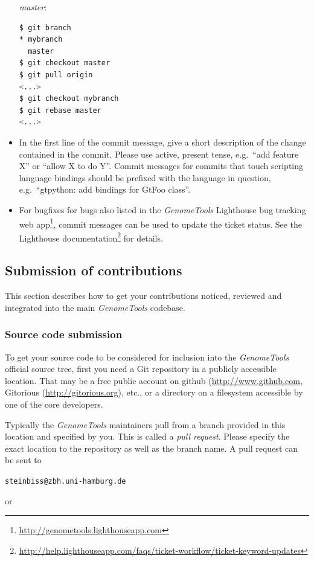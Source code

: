 \documentclass[11pt,final]{article}
\newcommand{\Gt}[0]{\emph{GenomeTools}\xspace}
\begin{document}
\begin{itemize}
\emph{master}:
    \begin{lstlisting}[language=sh]
$ git branch
* mybranch
  master
$ git checkout master
$ git pull origin
<...>
$ git checkout mybranch
$ git rebase master
<...>
    \end{lstlisting}%
\item
In the first line of the commit message, give a short description of the
change contained in the commit.  Please use active, present tense,
e.g.\ ``add feature X'' or ``allow X to do Y''.
Commit messages for commits that touch scripting
language bindings should be prefixed with the language in question,
e.g.\ ``gtpython: add bindings for GtFoo class''.
\item
For bugfixes for bugs also listed in the \Gt Lighthouse bug tracking web
app\footnote{\url{http://genometools.lighthouseapp.com}}, commit messages can
be used to update the ticket status. See the Lighthouse
documentation\footnote{\url{http://help.lighthouseapp.com/faqs/ticket-workflow/ticket-keyword-updates}} 
for details.
\end{itemize}

\subsection{Submission of contributions}

This section describes how to get your contributions noticed, reviewed and
integrated into the main \Gt codebase.

\subsubsection{Source code submission}

To get your source code to be considered for inclusion into the \Gt official
source tree, first you need a Git repository in a publicly accessible location.
That may be a free public account on github (\url{http://www.github.com},
Gitorious (\url{http://gitorious.org}), etc., or a directory on a filesystem
accessible by one of the core developers.

Typically the \Gt maintainers pull from a branch provided in this location and
specified by you. This is called a \emph{pull request}. Please specify the exact
location to the repository as well as the branch name. A pull request can be
sent to

\centerline{\texttt{steinbiss@zbh.uni-hamburg.de}}

or
\end{document}
